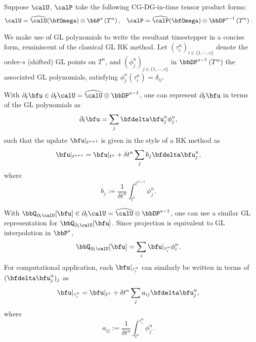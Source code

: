 
    \begin{example}
        Suppose $\calU$, $\calP$ take the following CG-DG-in-time tensor product forms:
        \begin{align}
            \calU  =  \widehat{\calU}(\bfOmega)\otimes\bbP^{s}\left(T^{n}\right),  &&
            \calP  =  \widehat{\calP}(\bfOmega)\otimes\bbDP^{s - 1}\left(T^{n}\right).
        \end{align}

        We make use of GL polynomials to write the resultant timestepper in a concise form, reminiscent of the classical GL RK method. Let $\left(\tau^{n}_{i}\right)_{i \in \{1, \cdots, s\}}$ denote the order-$s$ (shifted) GL points on $T^{n}$, and $\left(\phi^{n}_{j}\right)_{j \in \{1, \cdots, s\}}$ in $\bbDP^{s - 1}\left(T^{n}\right)$ the associated GL polynomials, satisfying $\phi^{n}_{j}(\tau^{n}_{i}) = \delta_{ij}$.

        With $\partial_{t}\bfu \in \partial_{t}\calU = \widehat{\calU}\otimes\bbDP^{s - 1}$, one can represent $\partial_{t}\bfu$ in terms of the GL polynomials as
        \begin{equation}
            \partial_{t}\bfu  =  \sum_{j}\bfdelta\bfu^{n}_{j}\phi^{n}_{j},
        \end{equation}
        such that the update $\bfu|_{t^{n + 1}}$ is given in the style of a RK method as
        \begin{equation}
            \bfu|_{t^{n + 1}}  =  \bfu|_{t^{n}} + \delta t^{n}\sum_{j}b_{j}\bfdelta\bfu^{n}_{j},
        \end{equation}
        where
        \begin{equation}
            b_{j}  :=  \frac{1}{\delta t^{n}}\int_{t^{n}}^{t^{n + 1}}\phi^{n}_{j}.
        \end{equation}

        With $\bbQ_{\partial_{t}\calU}[\bfu] \in \partial_{t}\calU = \widehat{\calU}\otimes\bbDP^{s - 1}$, one can use a similar GL representation for $\bbQ_{\partial_{t}\calU}[\bfu]$. Since projection is equivalent to GL interpolation in $\bbP^{s}$,
        \begin{equation}
            \bbQ_{\partial_{t}\calU}[\bfu]  =  \sum_{i}\bfu|_{\tau^{n}_{i}}\phi^{n}_{i}.
        \end{equation}
        For computational application, each $\bfu|_{\tau^{n}_{i}}$ can similarly be written in terms of $(\bfdelta\bfu^{n}_{j})_{j}$ as
        \begin{equation}
            \bfu|_{\tau^{n}_{i}}  =  \bfu|_{t^{n}} + \delta t^{n}\sum_{j}a_{ij}\bfdelta\bfu^{n}_{j},
        \end{equation}
        where
        \begin{equation}
            a_{ij}  :=  \frac{1}{\delta t^{n}}\int_{t^{n}}^{\tau^{n}_{i}}\phi^{n}_{j}.
        \end{equation}
        

\end{example}
